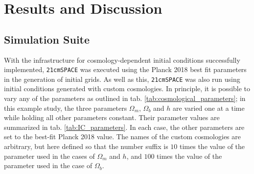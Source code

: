 \documentclass[floats,floatfix,showpacs,amssymb,prd,superscriptaddress,nofootinbib]{revtex4-2} %
\newcommand{\code}{\texttt}
\begin{document}


\newpage
\section{Results and Discussion}
\subsection{Simulation Suite}
With the infrastructure for cosmology-dependent initial conditions successfully implemented, \code{21cmSPACE} was executed using the Planck 2018 best fit parameters \citep{Planck2018results} in the generation of initial grids. As well as this, \code{21cmSPACE} was also run using initial conditions generated with custom cosmologies. In principle, it is possible to vary any of the parameters as outlined in tab. \ref{tab:cosmological_parameters}; in this example study, the three parameters $\Omega_m$, $\Omega_b$ and $h$ are varied one at a time while holding all other parameters constant. Their parameter values are summarized in tab. \ref{tab:IC_parameters}. In each case, the other parameters are set to the best-fit Planck 2018 value. The names of the custom cosmologies are arbitrary, but here defined so that the number suffix is $10$ times the value of the parameter used in the cases of $\Omega_m$ and $h$, and $100$ times the value of the parameter used in the case of $\Omega_b$. 
\end{document}
